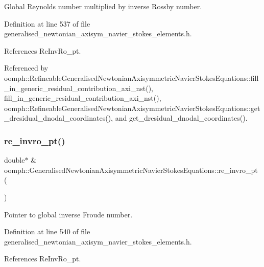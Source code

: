 Global Reynolds number multiplied by inverse Rossby number. 



Definition at line 537 of file generalised\+\_\+newtonian\+\_\+axisym\+\_\+navier\+\_\+stokes\+\_\+elements.\+h.



References Re\+Inv\+Ro\+\_\+pt.



Referenced by oomph\+::\+Refineable\+Generalised\+Newtonian\+Axisymmetric\+Navier\+Stokes\+Equations\+::fill\+\_\+in\+\_\+generic\+\_\+residual\+\_\+contribution\+\_\+axi\+\_\+nst(), fill\+\_\+in\+\_\+generic\+\_\+residual\+\_\+contribution\+\_\+axi\+\_\+nst(), oomph\+::\+Refineable\+Generalised\+Newtonian\+Axisymmetric\+Navier\+Stokes\+Equations\+::get\+\_\+dresidual\+\_\+dnodal\+\_\+coordinates(), and get\+\_\+dresidual\+\_\+dnodal\+\_\+coordinates().

\mbox{\label{classoomph_1_1GeneralisedNewtonianAxisymmetricNavierStokesEquations_adb41642dcc5ddd652f3ad1bf9a05fd07}} 
\subsubsection{\texorpdfstring{re\+\_\+invro\+\_\+pt()}{re\_invro\_pt()}}
{\footnotesize\ttfamily double$\ast$ \& oomph\+::\+Generalised\+Newtonian\+Axisymmetric\+Navier\+Stokes\+Equations\+::re\+\_\+invro\+\_\+pt (\begin{DoxyParamCaption}{ }\end{DoxyParamCaption})\hspace{0.3cm}{\ttfamily [inline]}}



Pointer to global inverse Froude number. 



Definition at line 540 of file generalised\+\_\+newtonian\+\_\+axisym\+\_\+navier\+\_\+stokes\+\_\+elements.\+h.



References Re\+Inv\+Ro\+\_\+pt.



